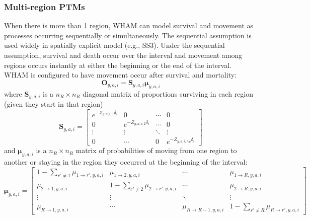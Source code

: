 \documentclass[
]{article}
\begin{document}
\hypertarget{multi-region-ptms}{%
\subsubsection*{Multi-region PTMs}\label{multi-region-ptms}}

When there is more than 1 region, WHAM can model survival and movement
as processes occurring sequentially or simultaneously. The sequential
assumption is used widely in spatially explicit model (e.g., SS3). Under
the sequential assumption, survival and death occur over the interval
and movement among regions occurs instantly at either the beginning or
the end of the interval. WHAM is configured to have movement occur after
survival and mortality: \begin{equation*}
  \mathbf{O}_{y,a,i} = \mathbf{S}_{y,a,i}\boldsymbol{\mu}_{y,a,i}
\end{equation*} where \(\mathbf{S}_{y,a,i}\) is a \(n_R \times n_R\)
diagonal matrix of proportions surviving in each region (given they
start in that region) \begin{equation*}
\mathbf{S}_{y,a,i} = 
  \begin{bmatrix}
    e^{-Z_{y,a,i,1}\delta_i} & 0 & \cdots & 0 \\
    0 & e^{-Z_{y,a,i,2}\delta_i} & \cdots & 0 \\
    \vdots & \vdots & \ddots & \vdots \\
    0 & \cdots & 0 & e^{-Z_{y,a,i,n_R}\delta_i}
  \end{bmatrix}
\end{equation*} and \(\boldsymbol{\mu}_{y,a,i}\) is a \(n_R \times n_R\)
matrix of probabilities of moving from one region to another or staying
in the region they occurred at the beginning of the interval:
\begin{equation*}
\boldsymbol{\mu}_{y,a,i} = 
  \begin{bmatrix}
    1-\sum_{r' \neq 1} \mu_{1\rightarrow r',y,a,i} & \mu_{1\rightarrow 2,y,a,i} & \cdots & \mu_{1\rightarrow R,y,a,i} \\
    \mu_{2\rightarrow 1,y,a,i} & 1-\sum_{r' \neq 2} \mu_{2\rightarrow r',y,a,i} & \cdots & \mu_{2\rightarrow R,y,a,i} \\
    \vdots & \vdots & \ddots & \vdots \\
    \mu_{R\rightarrow 1,y,a,i} & \cdots & \mu_{R\rightarrow R-1,y,a,i} & 1-\sum_{r' \neq R} \mu_{R\rightarrow r',y,a,i}
  \end{bmatrix}
\end{equation*}
\end{document}
